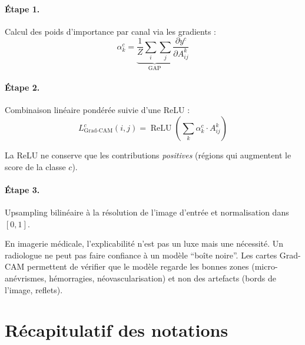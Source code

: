 \documentclass[11pt,a4paper]{article}
\DeclareMathOperator{\ReLU}{ReLU}
\begin{document}
\paragraph{Étape 1.} Calcul des poids d'importance par canal via les gradients :
\begin{equation}
  \alpha_k^c = \underbrace{\frac{1}{Z}\sum_{i}\sum_{j}}_{\text{GAP}} \frac{\partial y^c}{\partial A^k_{ij}}
\end{equation}

\paragraph{Étape 2.} Combinaison linéaire pondérée suivie d'une ReLU :
\begin{equation}
  \boxed{L^c_{\text{Grad-CAM}}(i,j) = \ReLU\!\left(\sum_{k} \alpha_k^c \cdot A^k_{ij}\right)}
\end{equation}

La ReLU ne conserve que les contributions \emph{positives} (régions qui augmentent le score de la classe $c$).

\paragraph{Étape 3.} Upsampling bilinéaire à la résolution de l'image d'entrée et normalisation dans $[0, 1]$.

\begin{notebox}
En imagerie médicale, l'explicabilité n'est pas un luxe mais une nécessité. Un radiologue ne peut pas faire confiance à un modèle ``boîte noire''. Les cartes Grad-CAM permettent de vérifier que le modèle regarde les bonnes zones (micro-anévrismes, hémorragies, néovascularisation) et non des artefacts (bords de l'image, reflets).
\end{notebox}

\section{Récapitulatif des notations}
\end{document}
